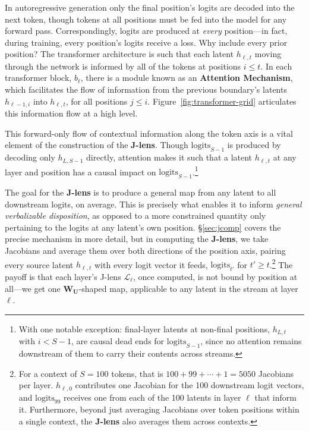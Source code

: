 \documentclass{article}
\newcommand{\logits}{\mathrm{logits}}
\newcommand{\jlens}{\mathscr{L}}
\begin{document}
In autoregressive generation only the final position's logits are decoded into the next token, though tokens at all positions must be fed into the model for any forward pass. Correspondingly, logits are produced at \textit{every} position---in fact, during training, every position's logits receive a loss. Why include every prior position? The transformer architecture is such that each latent \(h_{\ell, t}\) moving through the network is informed by all of the tokens at positions \(i\le t\). In each transformer block, \(b_\ell\), there is a module known as an \textbf{Attention Mechanism}, which facilitates the flow of information from the previous boundary's latents \(h_{\ell-1, i}\) into \(h_{\ell, t}\), for all positions \(j \le i\). Figure~\ref{fig:transformer-grid} articulates this information flow at a high level.

This forward-only flow of contextual information along the token axis is a vital element of the construction of the \textbf{J-lens}. Though \(\logits_{S-1}\) is produced by decoding only \(h_{L, S-1}\) directly, attention makes it such that a latent \(h_{\ell, t}\) at any layer and position has a causal impact on \(\logits_{S-1}\).\footnote{With one notable exception: final-layer latents at non-final positions, \(h_{L, t}\) with \(i < S-1\), are causal dead ends for \(\logits_{S-1}\), since no attention remains downstream of them to carry their contents across streams.} 

The goal for the \textbf{J-lens} is to produce a general map from any latent to all downstream logits, on average. This is precisely what enables it to inform \textit{general verbalizable disposition}, as opposed to a more constrained quantity only pertaining to the logits at any latent's own position. \S\ref{sec:jcomp} covers the precise mechanism in more detail, but in computing the \textbf{J-lens}, we take Jacobians and average them over both directions of the position axis, pairing every source latent \(h_{\ell,t}\) with every logit vector it feeds, \(\logits_{t'}\) for \(t' \ge t\).\footnote{For a context of \(S=100\) tokens, that is \(100 + 99 + \cdots + 1 = 5050\) Jacobians per layer. \(h_{\ell,0}\) contributes one Jacobian for the 100 downstream logit vectors, and \(\logits_{99}\) receives one from each of the 100 latents in layer \(\ell\) that inform it. Furthermore, beyond just averaging Jacobians over token positions within a single context, the \textbf{J-lens} also averages them across contexts.} The payoff is that each layer's J-lens $\jlens_\ell$, once computed, is not bound by position at all---we get one \(\mathbf{W_U}\)-shaped map, applicable to any latent in the stream at layer $\ell$. 
\end{document}
